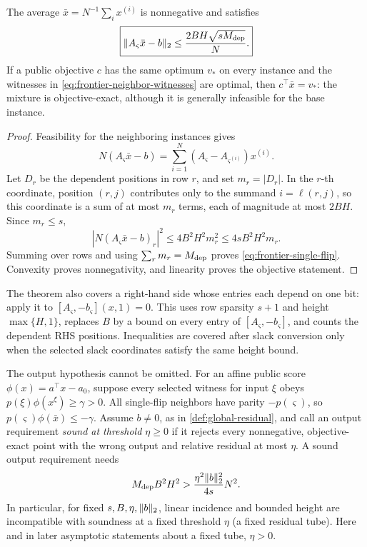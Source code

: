 \begin{theorem}
\label{thm:frontier-single-flip}
The average \(\bar x=N^{-1}\sum_i x^{(i)}\) is nonnegative and satisfies
\begin{equation}
 \boxed{\lVert A_{\varsigma}\bar x-b\rVert_2
 \leq \frac{2BH\sqrt{sM_{\rm dep}}}{N}.}
 \label{eq:frontier-single-flip}
\end{equation}
If a public objective \(c\) has the same optimum \(v_*\) on every instance
and the witnesses in \eqref{eq:frontier-neighbor-witnesses} are optimal, then
\(c^\top\bar x=v_*\): the mixture is objective-exact, although it is
generally infeasible for the base instance.
\end{theorem}

\begin{proof}
Feasibility for the neighboring instances gives
\[
 N(A_{\varsigma}\bar x-b)
 =\sum_{i=1}^N
   (A_{\varsigma}-A_{\varsigma^{(i)}})x^{(i)}.
\]
Let \(D_r\) be the dependent positions in row \(r\), and set
\(m_r=|D_r|\).  In the \(r\)-th coordinate, position \((r,j)\) contributes
only to the summand \(i=\ell(r,j)\), so this coordinate is a sum of at most
\(m_r\) terms, each of magnitude at most \(2BH\).
Since \(m_r\leq s\),
\[
 \left|N(A_{\varsigma}\bar x-b)_r\right|^2
 \leq4B^2H^2m_r^2
 \leq4sB^2H^2m_r.
\]
Summing over rows and using \(\sum_rm_r=M_{\rm dep}\) proves
\eqref{eq:frontier-single-flip}.  Convexity proves nonnegativity, and
linearity proves the objective statement.
\end{proof}

The theorem also covers a right-hand side whose entries each depend on one
bit: apply it to \([A_{\varsigma},-b_{\varsigma}](x,1)=0\).  This uses row
sparsity \(s+1\) and height \(\max\{H,1\}\), replaces \(B\) by a bound on
every entry of \([A_{\varsigma},-b_{\varsigma}]\), and counts the dependent
RHS positions.  Inequalities are covered after slack conversion only when
the selected slack coordinates satisfy the same height bound.

The output hypothesis cannot be omitted.  For an affine public score
\(\phi(x)=a^\top x-a_0\), suppose every selected witness for input \(\xi\)
obeys \(p(\xi)\phi(x^\xi)\geq\gamma>0\).  All single-flip neighbors have
parity \(-p(\varsigma)\), so
\(p(\varsigma)\phi(\bar x)\leq-\gamma\).  Assume \(b\neq0\), as in
\cref{def:global-residual}, and call an output requirement
\emph{sound at threshold \(\eta\geq0\)} if it rejects every nonnegative,
objective-exact point with the wrong output and relative residual at most
\(\eta\).  A sound output requirement needs
\begin{equation}
 M_{\rm dep}B^2H^2
 >\frac{\eta^2\lVert b\rVert_2^2}{4s}N^2.
 \label{eq:frontier-mixture-product}
\end{equation}
In particular, for fixed \(s,B,\eta,\lVert b\rVert_2\), linear incidence and
bounded height are incompatible with soundness at a fixed threshold
\(\eta\) (a fixed residual tube).  Here and in later asymptotic statements
about a fixed tube, \(\eta>0\).

